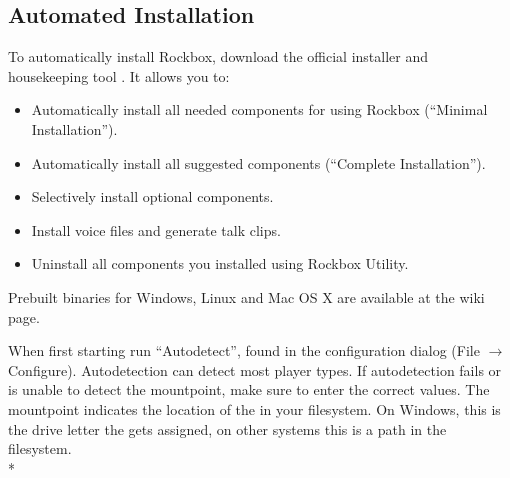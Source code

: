 \subsection{Automated Installation}

To automatically install Rockbox, download the official installer and
housekeeping tool . It allows you to:
\begin{itemize}
\item Automatically install all needed components for using Rockbox
        (``Minimal Installation'').
\item Automatically install all suggested components (``Complete Installation'').
\item Selectively install optional components.
\item Install voice files and generate talk clips.
\item Uninstall all components you installed using Rockbox Utility.
\end{itemize}

Prebuilt binaries for Windows, Linux and Mac OS X are
available at the  wiki page.\\


When first starting  run ``Autodetect'',
found in the configuration dialog (File $\rightarrow$ Configure). Autodetection
can detect most player types. If autodetection fails or is unable to detect 
the mountpoint, make sure to enter the correct values. The mountpoint indicates
the location of the \dap{} in your filesystem. On Windows, this is the drive
letter the \dap{} gets assigned, on other systems this is a path in the
filesystem.\\*

    {
}

